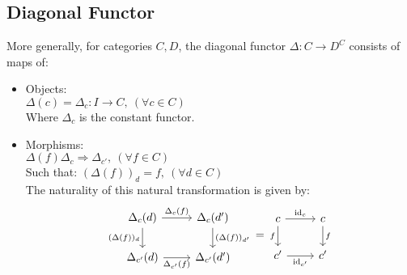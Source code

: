 \subsection{Diagonal Functor}
\begin{definition}
  More generally, for categories $C, D$, the diagonal functor $\Delta: C \to
  D^C$ consists of maps of: \parencite{leinster:basic_category_theory}
  \begin{itemize}
    \item Objects:\\
      $\Delta(c) = \Delta_c : I \to C,\ (\forall c\in C)$\\
      Where $\Delta_c$ is the constant functor.
    \item Morphisms:\\
      $\Delta(f)  \Delta_c \Rightarrow \Delta_{c'}
      ,\ (\forall f\in C)$\\
      Such that:
      $(\Delta(f))_d = f,\ (\forall d\in C)$\\
      The naturality of this natural transformation is given by:
      \[\begin{tikzcd}[ampersand replacement=\&]
        {\Delta_c(d)} \& {\Delta_c(d')} \\
        {\Delta_{c'}(d)} \& {\Delta_{c'}(d')}
        \arrow["{\Delta_c(f)}", from=1-1, to=1-2]
        \arrow["{(\Delta(f))_d}"', from=1-1, to=2-1]
        \arrow["{\Delta_{c'}(f)}"', from=2-1, to=2-2]
        \arrow["{(\Delta(f))_{d'}}", from=1-2, to=2-2]
      \end{tikzcd}
      =
      \begin{tikzcd}[ampersand replacement=\&]
        c \& c \\
        {c'} \& {c'}
        \arrow["{\id_c}", from=1-1, to=1-2]
        \arrow["f"', from=1-1, to=2-1]
        \arrow["{\id_{c'}}"', from=2-1, to=2-2]
        \arrow["f", from=1-2, to=2-2]
      \end{tikzcd}\]
  \end{itemize}
\end{definition}

